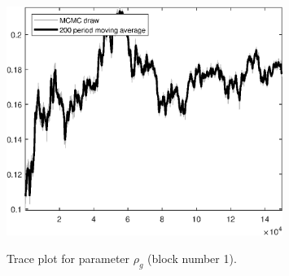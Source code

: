 \begin{figure}[H]
\centering
  \includegraphics[width=0.8\textwidth]{BRS_sectoral_KK/graphs/TracePlot_rho_g_blck_1}\\
    \caption{Trace plot for parameter ${\rho_g}$ (block number 1).}
\end{figure}
